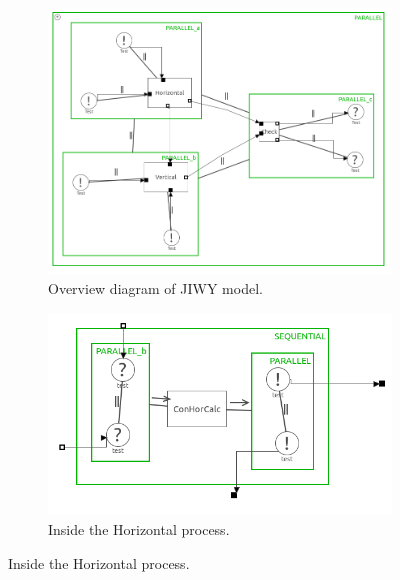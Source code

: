 \documentclass[a4paper,twoside,11pt]{article}
\begin{document}
\begin{figure}
	\begin{subfigure}{0.6\textwidth}
		\centering
		\includegraphics[width=\textwidth]{./images/4-3_overview.png}
		\caption{Overview diagram of JIWY model.}
		\label{sub:4_3_overview}
	\end{subfigure}%
	\begin{subfigure}{0.6\textwidth}
		\centering
		\includegraphics[width=\textwidth]{./images/4-3_hor.png}
		\caption{Inside the Horizontal process.}
		\label{sub:4_3_hor}
	\end{subfigure}%


\end{figure}
\end{document}

